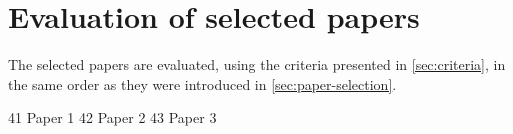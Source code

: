 \section{Evaluation of selected papers}
The selected papers are evaluated, using the criteria presented in \autoref{sec:criteria}, in the same order as they were introduced in \autoref{sec:paper-selection}.

{41 Paper 1}
{42 Paper 2}
{43 Paper 3}
